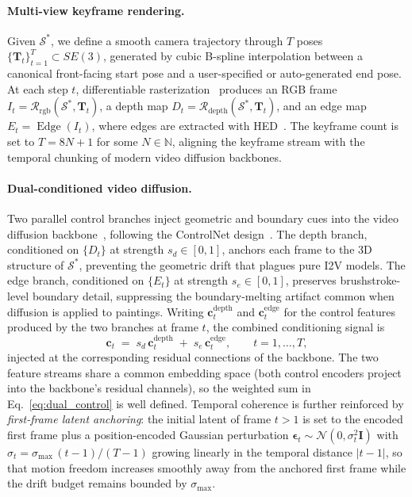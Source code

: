 \paragraph{Multi-view keyframe rendering.}
Given $\mathcal{S}^{*}$, we define a smooth camera trajectory through
$T$ poses $\{\mathbf{T}_t\}_{t=1}^{T} \subset SE(3)$, generated by
cubic B-spline interpolation between a canonical front-facing start
pose and a user-specified or auto-generated end pose. At each step $t$,
differentiable
rasterization~\cite{kerbl20233dgs,huang20242dgs} produces an RGB frame
$I_t = \mathcal{R}_{\mathrm{rgb}}(\mathcal{S}^{*},\mathbf{T}_t)$, a
depth map $D_t = \mathcal{R}_{\mathrm{depth}}
(\mathcal{S}^{*},\mathbf{T}_t)$, and an edge map
$E_t = \operatorname{Edge}(I_t)$, where edges are extracted with
HED~\cite{xie2015hed}. The keyframe count is set to
$T = 8N+1$ for some $N \in \mathbb{N}$, aligning the keyframe stream
with the temporal chunking of modern video diffusion backbones.

\paragraph{Dual-conditioned video diffusion.}
Two parallel control branches inject geometric and boundary cues into
the video diffusion backbone~\cite{ho2022video,blattmann2023svd},
following the ControlNet
design~\cite{zhang2023controlnet,wang2025easycontrol}. The depth branch, conditioned on
$\{D_t\}$ at strength $s_d \in [0,1]$, anchors each frame to the 3D
structure of $\mathcal{S}^{*}$, preventing the geometric drift that
plagues pure I2V models. The edge branch, conditioned on $\{E_t\}$ at
strength $s_e \in [0,1]$, preserves brushstroke-level boundary detail,
suppressing the boundary-melting artifact common when diffusion is
applied to paintings. Writing $\mathbf{c}_t^{\mathrm{depth}}$ and
$\mathbf{c}_t^{\mathrm{edge}}$ for the control features produced by the
two branches at frame $t$, the combined conditioning signal is
\begin{equation}
    \mathbf{c}_t \;=\; s_d \, \mathbf{c}_t^{\mathrm{depth}}
                   \;+\; s_e \, \mathbf{c}_t^{\mathrm{edge}},
    \qquad t = 1, \dots, T,
    \label{eq:dual_control}
\end{equation}
injected at the corresponding residual connections of the backbone.
The two feature streams share a common embedding space (both control
encoders project into the backbone's residual channels), so the
weighted sum in Eq.~\ref{eq:dual_control} is well defined.
Temporal coherence is further reinforced by \emph{first-frame latent
anchoring}: the initial latent of frame $t>1$ is set to the encoded
first frame plus a position-encoded Gaussian perturbation
$\boldsymbol{\epsilon}_t \sim \mathcal{N}(0, \sigma_t^2 \mathbf{I})$
with $\sigma_t = \sigma_{\max}\, (t-1)/(T-1)$ growing linearly in the
temporal distance $|t-1|$, so that motion freedom increases smoothly
away from the anchored first frame while the drift budget remains
bounded by $\sigma_{\max}$.

